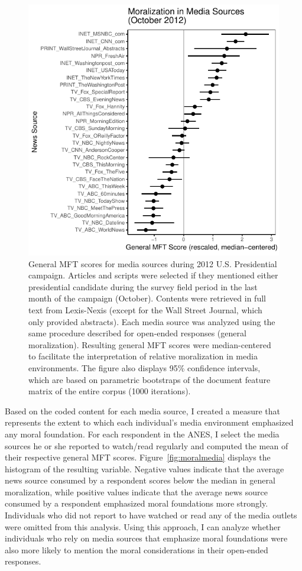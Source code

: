 \documentclass[12pt]{article}
\begin{document}
\begin{figure}[ht]\centering
\includegraphics{../calc/fig/media_desc.pdf}
\caption{General MFT scores for media sources during 2012 U.S. Presidential campaign. Articles and scripts were selected if they mentioned either presidential candidate during the survey field period in the last month of the campaign (October). Contents were retrieved in full text from Lexis-Nexis (except for the Wall Street Journal, which only provided abstracts). Each media source was analyzed using the same procedure described for open-ended responses (general moralization). Resulting general MFT scores were median-centered to facilitate the interpretation of relative moralization in media environments. The figure also displays 95\% confidence intervals, which are based on parametric bootstraps of the document feature matrix of the entire corpus (1000 iterations).}\label{fig:media_desc}
\end{figure}


Based on the coded content for each media source, I created a measure that represents the extent to which each individual's media environment emphasized any moral foundation. For each respondent in the ANES, I select the media sources he or she reported to watch/read regularly and computed the mean of their respective general MFT scores. Figure~\ref{fig:moralmedia} displays the histogram of the resulting variable. Negative values indicate that the average news source consumed by a respondent scores below the median in general moralization, while positive values indicate that the average news source consumed by a respondent emphasized moral foundations more strongly. Individuals who did not report to have watched or read any of the media outlets were omitted from this analysis. Using this approach, I can analyze whether individuals who rely on media sources that emphasize moral foundations were also more likely to mention the moral considerations in their open-ended responses. 
\end{document}
